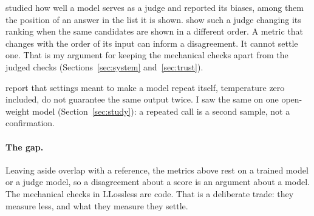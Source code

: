\citet{zheng2023judge} studied how well a model serves as a judge and reported its biases, among them the position of an answer in the list it is shown. \citet{wang2023evaluators} show such a judge changing its ranking when the same candidates are shown in a different order. A metric that changes with the order of its input can inform a disagreement. It cannot settle one. That is my argument for keeping the mechanical checks apart from the judged checks (Sections~\ref{sec:system} and~\ref{sec:trust}).

\citet{atil2024nondeterminism} report that settings meant to make a model repeat itself, temperature zero included, do not guarantee the same output twice. I saw the same on one open-weight model (Section~\ref{sec:study}): a repeated call is a second sample, not a confirmation.

\paragraph{The gap.} Leaving aside overlap with a reference, the metrics above rest on a trained model or a judge model, so a disagreement about a score is an argument about a model. The mechanical checks in LLossless are code. That is a deliberate trade: they measure less, and what they measure they settle.
